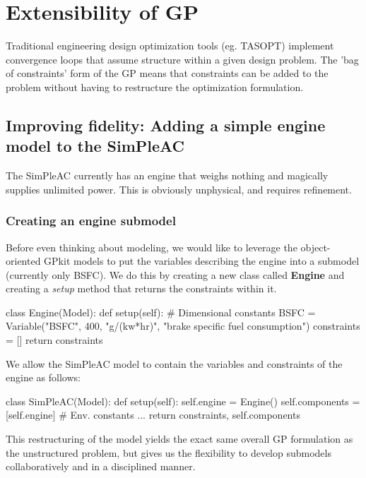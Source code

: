 \chapter{Extensibility of GP}
\label{ch3:extensibility}

Traditional engineering design optimization tools (eg. TASOPT) implement
convergence loops that assume structure within a given design problem.
The 'bag of constraints' form of the GP means that constraints can be
added to the problem without
having to restructure the optimization formulation.

\section{Improving fidelity: Adding a simple engine model to the SimPleAC}
\label{s:engine}

The SimPleAC currently has an engine that weighs nothing and magically supplies
unlimited power. This is obviously unphysical, and requires refinement.

\subsection{Creating an engine submodel}

Before even thinking about modeling, we would like to leverage the object-oriented 
GPkit models to put the variables describing the engine into a submodel (currently only 
BSFC). We do this by creating a new class called \textbf{Engine} and creating a \textit{setup}
method that returns the constraints within it.

\begin{python}
class Engine(Model):
    def setup(self):
        # Dimensional constants
        BSFC      = Variable("BSFC", 400, "g/(kw*hr)", "brake specific fuel consumption")
        constraints = []
        return constraints    
\end{python}

We allow the SimPleAC model to contain the variables and constraints of the engine
as follows:

\begin{python}
class SimPleAC(Model):
    def setup(self):
        self.engine = Engine()
        self.components = [self.engine]
        # Env. constants
        ...
        return constraints, self.components
\end{python}

This restructuring of the model yields the exact same overall \gls{GP} formulation
as the unstructured problem, but gives us the flexibility to develop submodels
collaboratively and in a disciplined manner.


